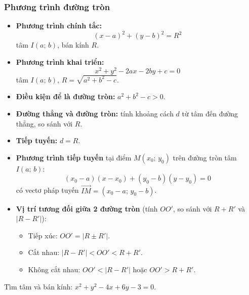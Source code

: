 \documentclass[12pt,a4paper]{article}
\begin{document}
\subsubsection{Phương trình đường tròn}

\begin{congthuc}[title={Phương trình đường tròn}]
  \begin{itemize}
    \item \textbf{Phương trình chính tắc:}
      \[
        (x - a)^2 + (y - b)^2 = R^2
      \]
      tâm $I(a;\, b)$, bán kính $R$.
    \item \textbf{Phương trình khai triển:}
      \[
        x^2 + y^2 - 2ax - 2by + c = 0
      \]
      tâm $I(a;\, b)$, $R = \sqrt{a^2 + b^2 - c}$.
    \item \textbf{Điều kiện để là đường tròn:} $a^2 + b^2 - c > 0$.
  \end{itemize}
\end{congthuc}

\begin{tinhchat}[title={Vị trí tương đối}]
  \begin{itemize}
    \item \textbf{Đường thẳng và đường tròn:} tính khoảng cách $d$ từ tâm đến đường thẳng, so sánh với $R$.
    \item \textbf{Tiếp tuyến:} $d = R$.
    \item \textbf{Phương trình tiếp tuyến} tại điểm $M(x_0;\, y_0)$ trên đường tròn tâm $I(a;\, b)$:
      \[
        (x_0 - a)(x - x_0) + (y_0 - b)(y - y_0) = 0
      \]
      có vectơ pháp tuyến $\overrightarrow{IM} = (x_0 - a;\, y_0 - b)$.
    \item \textbf{Vị trí tương đối giữa 2 đường tròn} (tính $OO'$, so sánh với $R + R'$ và $|R - R'|$):
      \begin{itemize}
        \item Tiếp xúc: $OO' = |R \pm R'|$.
        \item Cắt nhau: $|R - R'| < OO' < R + R'$.
        \item Không cắt nhau: $OO' < |R - R'|$ hoặc $OO' > R + R'$.
      \end{itemize}
  \end{itemize}
\end{tinhchat}

\begin{vidu}
  Tìm tâm và bán kính: $x^2 + y^2 - 4x + 6y - 3 = 0$.
\end{vidu}
\end{document}
